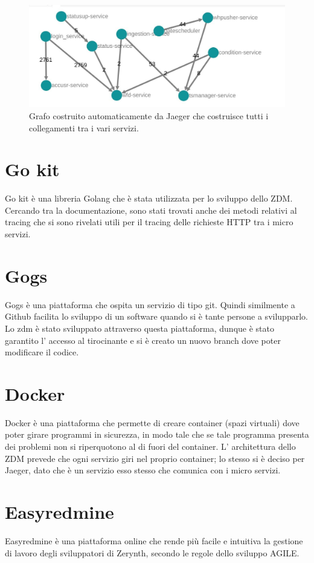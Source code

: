 \documentclass[a4paper,12pt,titlepage,italian,openany]{report}
\begin{document}
\begin{figure}[H]
    \includegraphics[scale=0.4]{grafo.jpg}
    \centering
    \caption{Grafo costruito automaticamente da Jaeger che costruisce tutti i collegamenti tra i vari servizi.}
\end{figure}

\section{Go kit}
Go kit\cite{go:2} è una libreria Golang che è stata utilizzata per lo sviluppo dello ZDM\cite{zdm:1}. Cercando tra la documentazione, sono stati trovati anche dei metodi relativi al tracing che si sono rivelati utili
per il tracing delle richieste HTTP tra i micro servizi. 
\section{Gogs}
Gogs\cite{gogs:1} è una piattaforma che ospita un servizio di tipo git. Quindi similmente a Github facilita lo sviluppo di un software quando si è tante persone a svilupparlo. Lo zdm è stato sviluppato attraverso questa piattaforma, dunque è stato garantito l' accesso al tirocinante e si è creato un nuovo branch dove poter modificare il codice. 

\section{Docker}
Docker\cite{docker:1} è una piattaforma che permette di creare container (spazi virtuali) dove poter girare programmi in sicurezza, in modo tale che se tale programma presenta dei problemi non si riperquotono al di fuori del container. L' architettura dello ZDM\cite{zdm:1} prevede che ogni servizio giri nel proprio container; lo stesso si è deciso per Jaeger, dato che è un servizio esso stesso che comunica con i micro servizi.
\section{Easyredmine}
Easyredmine\cite{easyredmine:1} è una piattaforma online che rende più facile e intuitiva la gestione di lavoro degli sviluppatori di Zerynth, secondo le regole dello sviluppo AGILE.
\end{document}
